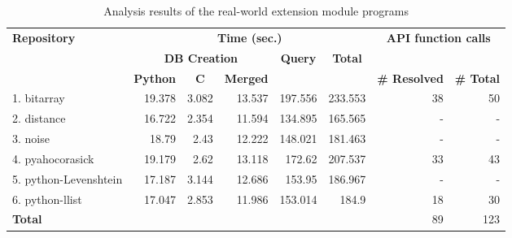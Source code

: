 \begin{table*}[t]
  \vspace{2mm}
  \caption{Analysis results of the real-world extension module programs}
  \label{table:RQ1-4}
  \vspace*{-1em}
  \centering
  \small
\renewcommand{\arraystretch}{.9}
  \begin{tabular}{l||r|r|r|r|r||r|r}
    \multirow{3}{*}{\textbf{Repository}} & \multicolumn{5}{c||}{\textbf{Time (sec.)}} & \multicolumn{2}{c}{\multirow{2}{*}{\textbf{API function calls}}} \\\hhline{~||-----||~~}
    & \multicolumn{3}{c|}{\textbf{DB Creation}} & \multicolumn{1}{c|}{\multirow{2}{*}{\textbf{Query}}} & \multicolumn{1}{c||}{\multirow{2}{*}{\textbf{Total}}} & \multicolumn{2}{c}{}  \\\hhline{~||---~|~||--}
    & \multicolumn{1}{c|}{\textbf{Python}} & \multicolumn{1}{c|}{\textbf{C}} & \multicolumn{1}{c|}{\textbf{Merged}} & \multicolumn{1}{c|}{} & \multicolumn{1}{c||}{} & \multicolumn{1}{c|}{\textbf{\# Resolved}} & \multicolumn{1}{c}{\textbf{\# Total}} \\\hhline{=#*{4}{=|}=#=|=}
  1. bitarray           & 19.378 & 3.082 & 13.537 & 197.556 & 233.553 & 38 & 50 \\
  2. distance           & 16.722 & 2.354 & 11.594 & 134.895 & 165.565 & -  & -  \\
  3. noise              & 18.79  & 2.43  & 12.222 & 148.021 & 181.463 & -  & -  \\
  4. pyahocorasick      & 19.179 & 2.62  & 13.118 & 172.62  & 207.537 & 33 & 43 \\
  5. python-Levenshtein & 17.187 & 3.144 & 12.686 & 153.95  & 186.967 & -  & -  \\
  6. python-llist       & 17.047 & 2.853 & 11.986 & 153.014 & 184.9   & 18 & 30 \\\hhline{=#*{4}{=}=#=|=}
    \textbf{Total}       & \multicolumn{1}{r}{}  & \multicolumn{1}{r}{}     & \multicolumn{1}{r}{}       & \multicolumn{1}{r}{}                       & \multicolumn{1}{r||}{}                    & 89                         & 123                          
  \end{tabular}
\end{table*}

